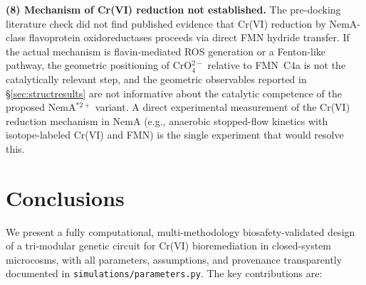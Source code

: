 \documentclass[10pt,twocolumn,letterpaper,
              colorlinks=true,
              linkcolor=blue!70!black,
              citecolor=blue!70!black,
              urlcolor=blue!70!black,
              pdfborder={0 0 0}]{article}
\begin{document}
\medskip
\noindent\textbf{(8) Mechanism of Cr(VI) reduction not established.}
The pre-docking literature check did not find published evidence that
Cr(VI) reduction by NemA-class flavoprotein oxidoreductases proceeds via
direct FMN hydride transfer. If the actual mechanism is flavin-mediated
ROS generation or a Fenton-like pathway, the geometric positioning of
CrO$_4^{2-}$ relative to FMN~C4a is not the catalytically relevant
step, and the geometric observables reported in
\S\ref{sec:structresults} are not informative about the catalytic
competence of the proposed NemA$^{*2+}$ variant. A direct experimental
measurement of the Cr(VI) reduction mechanism in NemA (e.g., anaerobic
stopped-flow kinetics with isotope-labeled Cr(VI) and FMN) is the
single experiment that would resolve this.



\section{Conclusions}

We present a fully computational, multi-methodology biosafety-validated
design of a tri-modular genetic circuit for Cr(VI) bioremediation in
closed-system microcosms, with all parameters, assumptions, and
provenance transparently documented in \texttt{simulations/parameters.py}.
The key contributions are:
\end{document}
